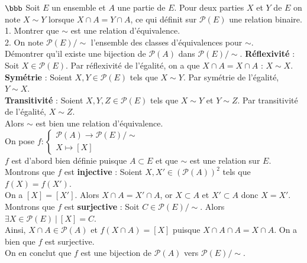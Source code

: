 \documentclass[11pt]{article}
\begin{document}
\begin{exercice}{$\bbb$}{}
    Soit $E$ un ensemble et $A$ une partie de $E$. Pour deux parties $X$ et $Y$ de $E$ on note $X\sim Y$ lorsque $X \cap A = Y \cap A$, ce qui définit sur $\mathcal{P}(E)$ une relation binaire.\\
    1. Montrer que $\sim$ est une relation d'équivalence.\\
    2. On note $\mathcal{P}(E)/\sim$ l'ensemble des classes d'équivalences pour $\sim$.\\
    Démontrer qu'il existe une bijection de $\mathcal{P}(A)$ dans $\mathcal{P}(E)/\sim$.
    \tcblower
     \textbf{Réflexivité} : Soit $X\in\mathcal{P}(E)$. Par réflexivité de l'égalité, on a que $X \cap A = X \cap A$ : $X \sim X$.\\
    \textbf{Symétrie} : Soient $X,Y\in\mathcal{P}(E)$ tels que $X \sim Y$. Par symétrie de l'égalité, $Y \sim X$.\\
    \textbf{Transitivité} : Soient $X,Y,Z \in \mathcal{P}(E)$ tels que $X \sim Y$ et $Y \sim Z$. Par transitivité de l'égalité, $X \sim Z$.\\
    Alors $\sim$ est bien une relation d'équivalence.\\[0.15cm]
    On pose $f:\begin{cases}
        \mathcal{P}(A) \to \mathcal{P}(E)/\sim\\
        X \mapsto [X]
    \end{cases}$\\
    $f$ est d'abord bien définie puisque $A \subset E$ et que $\sim$ est une relation sur $E$.\\[0.15cm]
    Montrons que $f$ est \textbf{injective} : Soient $X,X' \in (\mathcal{P}(A))^2$ tels que $f(X) = f(X')$.\\
    On a $[X] = [X']$. Alors $X \cap A = X' \cap A$, or $X \subset A$ et $X' \subset A$ donc $X = X'$.\\[0.15cm]
    Montrons que $f$ est \textbf{surjective} : Soit $C\in\mathcal{P}(E)/\sim$. Alors $\exists X \in \mathcal{P}(E) ~ | ~ [X] = C$.\\
    Ainsi, $X \cap A \in \mathcal{P}(A)$ et $f(X \cap A) = [X]$ puisque $X \cap A \cap A = X \cap A$. On a bien que $f$ est surjective.\\[0.15cm]
    On en conclut que $f$ est une bijection de $\mathcal{P}(A)$ vers $\mathcal{P}(E)/\sim$.
\end{exercice}
\end{document}
